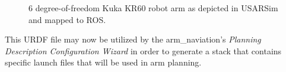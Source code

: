 \begin{figure}[t!]
\centering
{}\qquad
{}
\caption{6 degree-of-freedom Kuka KR60 robot arm as depicted in USARSim and mapped to ROS.}
\end{figure}

This URDF file may now be utilized by the arm\_naviation's {\it Planning Description Configuration Wizard} in order to generate a stack that contains specific launch files that will be used in arm planning.